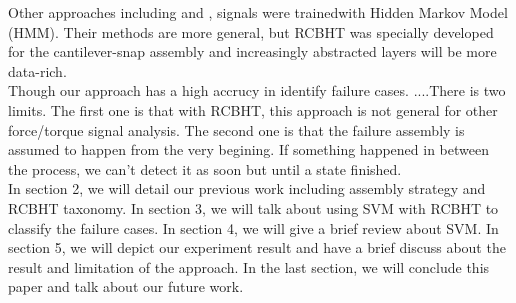\indent Other approaches including \cite{rodriguez2011abort} and \cite{di2013bayesian}, signals were trainedwith Hidden Markov Model (HMM). Their methods are more general, but RCBHT was specially developed for the cantilever-snap assembly and increasingly abstracted layers will be more data-rich. \\
\indent Though our approach has a high accrucy in identify failure cases. ....There is two limits. The first one is that with RCBHT, this approach is not general for other force/torque signal analysis. The second one is that the failure assembly is assumed to happen from the very begining. If something happened in between the process, we can't detect it as soon but until a state finished. \\
\indent In section 2, we will detail our previous work including assembly strategy and RCBHT taxonomy. In section 3, we will talk about using SVM with RCBHT to classify the failure cases. In section 4, we will give a brief review about SVM. In section 5, we will depict our experiment result and have a brief discuss about the result and limitation of the approach. In the last section, we will conclude this paper and talk about our future work. \\
